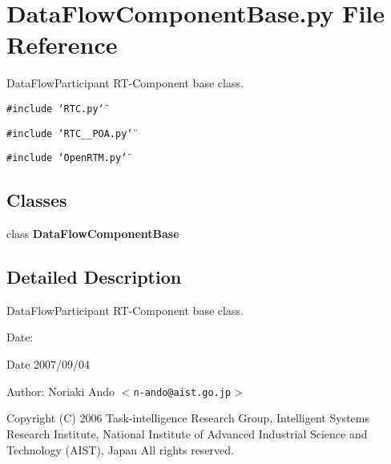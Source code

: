 \section{Data\-Flow\-Component\-Base.py File Reference}
\label{DataFlowComponentBase_8py}
Data\-Flow\-Participant RT-Component base class. 

{\tt \#include \char`\"{}RTC.py\char`\"{}}\par
{\tt \#include \char`\"{}RTC\_\-\_\-POA.py\char`\"{}}\par
{\tt \#include \char`\"{}Open\-RTM.py\char`\"{}}\par
\subsection*{Classes}
\begin{CompactItemize}
\item 
class {\bf Data\-Flow\-Component\-Base}
\end{CompactItemize}


\subsection{Detailed Description}
Data\-Flow\-Participant RT-Component base class. 

\begin{Desc}
\item[Date:]\begin{Desc}
\item[Date]2007/09/04\end{Desc}
\end{Desc}
\begin{Desc}
\item[Author:]Noriaki Ando $<${\tt n-ando@aist.go.jp}$>$\end{Desc}
Copyright (C) 2006 Task-intelligence Research Group, Intelligent Systems Research Institute, National Institute of Advanced Industrial Science and Technology (AIST), Japan All rights reserved.